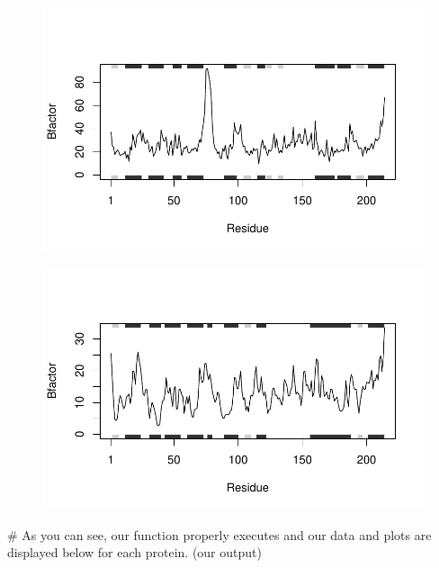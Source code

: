 \documentclass[
  letterpaper,
  DIV=11,
  numbers=noendperiod]{scrartcl}
\newenvironment{Shaded}{\begin{snugshade}}{\end{snugshade}}
\newcommand{\CommentTok}[1]{\textcolor[rgb]{0.37,0.37,0.37}{#1}}
\begin{document}
\begin{figure}[H]

{\centering \includegraphics{hw6_turnin_files/figure-pdf/unnamed-chunk-7-2.pdf}

}

\end{figure}

\begin{figure}[H]

{\centering \includegraphics{hw6_turnin_files/figure-pdf/unnamed-chunk-7-3.pdf}

}

\end{figure}

\begin{Shaded}
\begin{Highlighting}[]
\CommentTok{\# As you can see, our function properly executes and our data and plots are displayed below for each protein. (our output)}
\end{Highlighting}
\end{Shaded}
\end{document}
